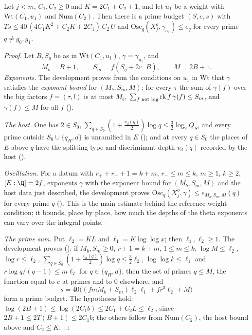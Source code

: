 \begin{lemma}\label{pf:lift1:sumat}
Let $j<m$, $C_1,C_2\ge0$ and $K=2C_1+C_2+1$, and let $u_1$ be a weight with $\mathrm{Wt}(C_1,u_1)$ and
$\mathrm{Num}(C_2)$. Then there is a prime budget $(S,e,s)$ with
$Ts\le40\,(4C_1K^2+C_2K+2C_1)\,C_2\,U$ and $\mathrm{Osc}_q(X^o_j,\gamma_{u_1})\le e_q$ for every prime
$q\ne g_0,g_1$.
\end{lemma}

\begin{proof}
Let $B,S_g$ be as in $\mathrm{Wt}(C_1,u_1)$, $\gamma=\gamma_{u_1}$, and
\[
M_b=B+1,\qquad S_m=f(S_g+2r_-B),\qquad M=2B+1 .
\]
\emph{Exponents.} The development proves from the conditions on $u_1$ in $\mathrm{Wt}$ that $\gamma$
satisfies the \emph{exponent bound} for $(M_b,S_m,M)$: for every $\tau$ the sum of $\gamma(f)$ over the
big factors $f=(\tau,l)$ is at most $M_b$, $\sum_{f\text{ not big}}\operatorname{rk} f\,\gamma(f)\le S_m$, and
$\gamma(f)\le M$ for all $f$ ().

\emph{The host.} One has $2\in S_0$, $\sum_{q\in S_0}(1+\frac{v_d(q)}2)\log q\le\frac32\log_2Q_S$, and
every prime outside $S_0\cup\{q_H,d\}$ is unramified in $E$
(); and at every $q\in S_0$ the places of $E$ above $q$ have the
splitting type and discriminant depth $v_d(q)$ recorded by the host
().

\emph{Oscillation.} For a datum with $r_++r_-+1=k+m$, $r_-\le m\le k$, $m\ge1$, $k\ge2$, $[E:\Q]=2f$,
exponents $\gamma$ with the exponent bound for $(M_b,S_m,M)$ and the host data just described, the
development proves $\mathrm{Osc}_q(X^o_j,\gamma)\le e_{M_b,S_m,M}(q)$ for every prime $q$
(). This is the main estimate behind
the reference weight condition; it bounds, place by place, how much the depths of the theta exponents
can vary over the integral points.

\emph{The prime sum.} Put $\ell_2=KL$ and $\ell_1=K\log\log x$; then $\ell_1,\ell_2\ge1$. The development
proves (): if $M_b,S_m\ge0$,
$r+1=k+m$, $1\le m\le k$, $\log M\le\ell_2$, $\log r\le\ell_2$,
$\sum_{q\in S_0}(1+\frac{v_d(q)}2)\log q\le\frac32\ell_2$, $\log\log k\le\ell_1$ and
$r\log q/(q-1)\le m\ell_2$ for $q\in\{q_H,d\}$, then the set of primes $q\le M$, the function equal to $e$
at primes and to $0$ elsewhere, and
\[
s=40\bigl((fmM_b+S_m)\ell_2\ell_1+fr^3\ell_2+M\bigr)
\]
form a prime budget. The hypotheses hold: $\log(2B+1)\le\log(2C_1b)\le2C_1+C_2L\le\ell_2$, since
$2B+1\le2T(B+1)\le2C_1b$; the others follow from $\mathrm{Num}(C_2)$, the host bound above and $C_2\le K$.


\end{proof}
